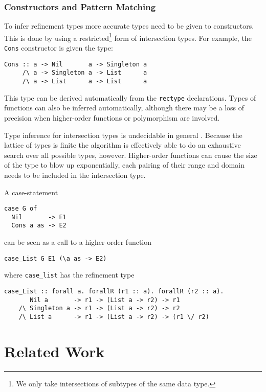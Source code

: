 \documentclass[a4paper]{report}
\begin{document}
\subsection{Constructors and Pattern Matching}

To infer refinement types more accurate types need to be given to constructors. This is done by using a restricted\footnote{We only take intersections of subtypes of the same data type.} form of intersection types. For example, the {\tt Cons} constructor is given the type:

\begin{verbatim}
Cons :: a -> Nil       a -> Singleton a
     /\ a -> Singleton a -> List      a
     /\ a -> List      a -> List      a
\end{verbatim}

This type can be derived automatically from the {\tt rectype} declarations. Types of functions can also be inferred automatically, although there may be a loss of precision when higher-order functions or polymorphism are involved.

Type inference for intersection types is undecidable in general \cite{Pierce91programmingwith,Reynolds96designof}. Because the lattice of types is finite the algorithm is effectively able to do an exhaustive search over all possible types, however. Higher-order functions can cause the size of the type to blow up exponentially, each pairing of their range and domain needs to be included in the intersection type.

A case-statement 

\begin{verbatim}
case G of
  Nil       -> E1
  Cons a as -> E2
\end{verbatim}

can be seen as a call to a higher-order function

\begin{verbatim}
case_List G E1 (\a as -> E2)
\end{verbatim}

where {\tt case\_list} has the refinement type

\begin{verbatim}
case_List :: forall a. forallR (r1 :: a). forallR (r2 :: a).
       Nil a       -> r1 -> (List a -> r2) -> r1
    /\ Singleton a -> r1 -> (List a -> r2) -> r2
    /\ List a      -> r1 -> (List a -> r2) -> (r1 \/ r2)
\end{verbatim}

\chapter{Related Work}\label{secrelatedwork}
\end{document}
